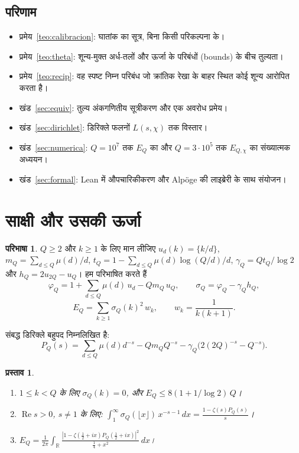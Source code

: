 \documentclass[11pt,a4paper]{amsart}
\newtheorem{proposicion}[teorema]{प्रस्ताव}
\theoremstyle{definition}
\newtheorem{definicion}[teorema]{परिभाषा}
\theoremstyle{remark}
\renewcommand{\Re}{\operatorname{Re}}
\begin{document}
\subsection*{परिणाम}
\begin{itemize}
\item प्रमेय~\ref{teo:calibracion}: घातांक का सूत्र, बिना किसी परिकल्पना के।
\item प्रमेय~\ref{teo:theta}: शून्य-मुक्त अर्ध-तलों और ऊर्जा के परिबंधों (bounds) के बीच तुल्यता।
\item प्रमेय~\ref{teo:recip}: वह स्पष्ट निम्न परिबंध जो क्रांतिक रेखा के बाहर स्थित कोई शून्य आरोपित करता है।
\item खंड~\ref{sec:equiv}: तुल्य अंकगणितीय सूत्रीकरण और एक अवरोध प्रमेय।
\item खंड~\ref{sec:dirichlet}: डिरिक्ले फलनों $L(s,\chi)$ तक विस्तार।
\item खंड~\ref{sec:numerica}: $Q=10^7$ तक $E_Q$ का और $Q=3\cdot10^5$ तक $E_{Q,\chi}$ का संख्यात्मक अध्ययन।
\item खंड~\ref{sec:formal}: Lean में औपचारिकीकरण और Alp\"oge की लाइब्रेरी के साथ संयोजन।
\end{itemize}

\section{साक्षी और उसकी ऊर्जा}

\begin{definicion}
$Q\ge2$ और $k\ge1$ के लिए मान लीजिए $u_d(k)=\{k/d\}$, $m_Q=\sum_{d\le Q}\mu(d)/d$, $t_Q=1-\sum_{d\le Q}\mu(d)\log(Q/d)/d$, $\gamma_Q=Qt_Q/\log2$ और $h_Q=2u_{2Q}-u_Q$। हम परिभाषित करते हैं
\[
\varphi_Q=1+\sum_{d\le Q}\mu(d)\,u_d-Qm_Q\,u_Q,\qquad
\sigma_Q=\varphi_Q-\gamma_Q h_Q,
\]
\[
E_Q=\sum_{k\ge1}\sigma_Q(k)^2\,w_k,\qquad w_k=\frac1{k(k+1)}.
\]
\end{definicion}

संबद्ध डिरिक्ले बहुपद निम्नलिखित है:
\[
P_Q(s)=\sum_{d\le Q}\mu(d)d^{-s}-Qm_QQ^{-s}-\gamma_Q\bigl(2(2Q)^{-s}-Q^{-s}\bigr).
\]

\begin{proposicion}\label{prop:mellin}
\begin{enumerate}
\item $1\le k<Q$ के लिए $\sigma_Q(k)=0$, और $E_Q\le 8(1+1/\log2)\,Q$।
\item $\Re s>0$, $s\ne1$ के लिए: $\displaystyle\int_1^\infty\sigma_Q(\lfloor x\rfloor)\,x^{-s-1}\,dx=\frac{1-\zeta(s)P_Q(s)}{s}$।
\item $\displaystyle E_Q=\frac1{2\pi}\int_{\mathbb R}\frac{|1-\zeta(\tfrac12+ix)P_Q(\tfrac12+ix)|^2}{\tfrac14+x^2}\,dx$।
\end{enumerate}
\end{proposicion}
\end{document}
